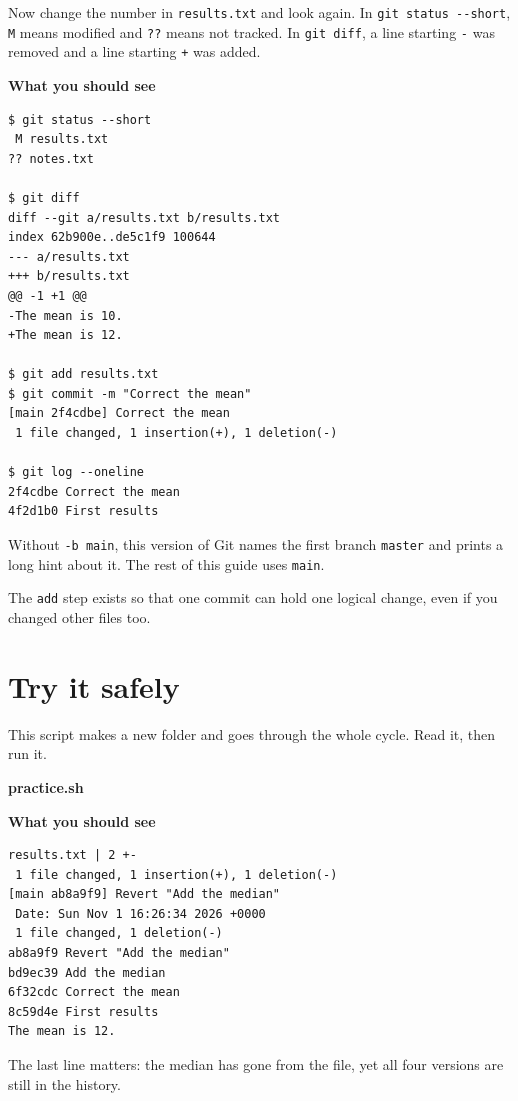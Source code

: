 Now change the number in \texttt{results.txt} and look again. In \texttt{git\ status\ -\/-short}, \texttt{M} means modified and \texttt{??} means not tracked. In \texttt{git\ diff}, a line starting \texttt{-} was removed and a line starting \texttt{+} was added.

\textbf{What you should see}

\begin{lstlisting}[language=text]
$ git status --short
 M results.txt
?? notes.txt

$ git diff
diff --git a/results.txt b/results.txt
index 62b900e..de5c1f9 100644
--- a/results.txt
+++ b/results.txt
@@ -1 +1 @@
-The mean is 10.
+The mean is 12.

$ git add results.txt
$ git commit -m "Correct the mean"
[main 2f4cdbe] Correct the mean
 1 file changed, 1 insertion(+), 1 deletion(-)

$ git log --oneline
2f4cdbe Correct the mean
4f2d1b0 First results
\end{lstlisting}

Without \texttt{-b\ main}, this version of Git names the first branch \texttt{master} and prints a long hint about it. The rest of this guide uses \texttt{main}.

The \texttt{add} step exists so that one commit can hold one logical change, even if you changed other files too.

\section{Try it safely}\label{try-it-safely}

This script makes a new folder and goes through the whole cycle. Read it, then run it.

\textbf{practice.sh}



\textbf{What you should see}

\begin{lstlisting}[language=text]
 results.txt | 2 +-
 1 file changed, 1 insertion(+), 1 deletion(-)
[main ab8a9f9] Revert "Add the median"
 Date: Sun Nov 1 16:26:34 2026 +0000
 1 file changed, 1 deletion(-)
ab8a9f9 Revert "Add the median"
bd9ec39 Add the median
6f32cdc Correct the mean
8c59d4e First results
The mean is 12.
\end{lstlisting}

The last line matters: the median has gone from the file, yet all four versions are still in the history.

